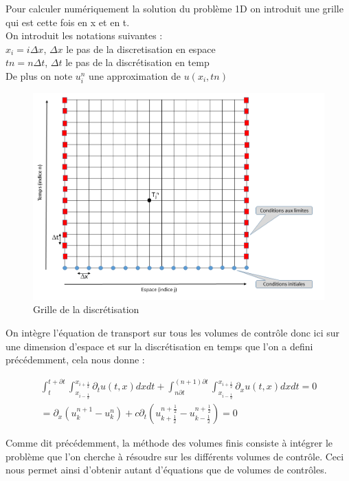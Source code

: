 \documentclass[12pt]{article}
\begin{document}
\noindent Pour calculer numériquement la solution du problème 1D on introduit une grille qui est cette fois en x et en t.
\\On introduit les notations suivantes : 
\\$x_i=i\Delta x$, $\Delta x$ le pas de la discretisation en espace
\\$tn=n\Delta t$, $\Delta t$ le pas de la discrétisation en temp
\\De plus on note $u_i^n$ une approximation de $u(x_i,tn)$
 \begin{figure}[H]
	\centering
	\includegraphics[scale=0.3]{DFGrille.PNG}
	\caption{Grille de la discrétisation}
	\label{1D}
	\end{figure}
\noindent On intègre l’équation de transport sur tous les volumes de contrôle donc ici sur une dimension d'espace et sur la discrétisation en temps que l'on a defini précédemment, cela nous donne :

\begin{eqnarray}
       \int_{t}^{t+\partial t}\int_{x_{i-\frac{1}{2}}}^{x_{i+\frac{1}{2}}}\partial_tu(t,x) dxdt + \int_{n\partial t}^{(n+1)\partial t}\int_{x_{i-\frac{1}{2}}}^{x_{i+\frac{1}{2}}} \partial_xu(t,x) dxdt =0
      \\ = \partial_x (u_k^{n+1} -u_k^n) + c\partial_t (u_{k+\frac{1}{2}}^{n+\frac{1}{2}}-u_{k-\frac{1}{2}}^{n+\frac{1}{2}})=0
\end{eqnarray}

\noindent Comme dit précédemment, la méthode des volumes finis consiste à intégrer le problème que l'on cherche à résoudre sur les différents volumes de contrôle. Ceci nous permet ainsi d'obtenir autant d'équations que de volumes de contrôles. 
\end{document}
